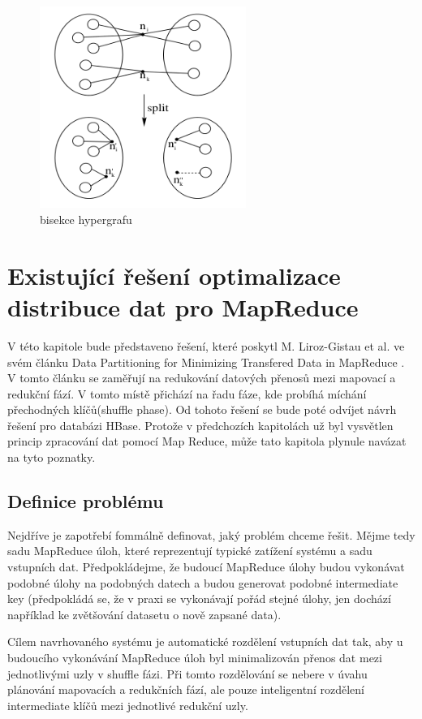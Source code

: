 \documentclass[thesis=M,czech]{FITthesis}[2012/06/26]
\begin{document}
\begin{figure}\centering
	\includegraphics[width=0.6\textwidth, angle=0]{files/bisection.png}
	\caption[bisekce hypergrafu]{bisekce hypergrafu}\label{figbisection}
\end{figure}


\chapter{Existující řešení optimalizace distribuce dat pro MapReduce}
V této kapitole bude představeno řešení, které poskytl M. Liroz-Gistau et al. ve svém článku Data Partitioning for Minimizing Transfered Data in MapReduce \cite{gistau}. V tomto článku se zaměřují na redukování datových přenosů mezi mapovací a redukční fází. V tomto místě přichází na řadu fáze, kde probíhá míchání přechodných klíčů(shuffle phase). Od tohoto řešení se bude poté odvíjet návrh řešení pro databázi HBase. Protože v předchozích kapitolách už byl vysvětlen princip zpracování dat pomocí Map Reduce, může tato kapitola plynule navázat na tyto poznatky. 

\section{Definice problému}
Nejdříve je zapotřebí fommálně definovat, jaký problém chceme řešit. Mějme tedy sadu MapReduce úloh, které reprezentují typické zatížení systému a sadu vstupních dat. Předpokládejme, že budoucí MapReduce úlohy budou vykonávat podobné úlohy na podobných datech a budou generovat podobné intermediate key (předpokládá se, že v praxi se vykonávají pořád stejné úlohy, jen dochází například ke zvětšování datasetu o nově zapsané data). 

Cílem navrhovaného systému je automatické rozdělení vstupních dat tak, aby u budoucího vykonávání MapReduce úloh byl minimalizován přenos dat mezi jednotlivými uzly v shuffle fázi. Při tomto rozdělování se nebere v úvahu plánování mapovacích a redukčních fází, ale pouze inteligentní rozdělení intermediate klíčů mezi jednotlivé redukční uzly.
\end{document}
